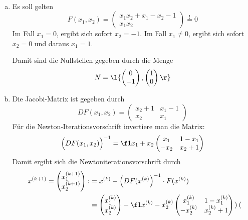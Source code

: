 \documentclass[a4paper]{scrartcl}
\begin{document}
\begin{aufgabe}~

	\begin{enumerate}[a)]
		\item
			Es soll gelten
			\[
				F(x_1,x_2) = \begin{pmatrix}
					x_1x_2 + x_1 - x_2 - 1 \\ x_1x_2
				\end{pmatrix}
				\stackrel != 0
			\]
			Im Fall $x_1 = 0$, ergibt sich sofort $x_2 = -1$.
			Im Fall $x_1 \neq 0$, ergibt sich sofort $x_2 = 0$ und daraus $x_1 = 1$.

			Damit sind die Nullstellen gegeben durch die Menge
			\[
				N = \l\{ \begin{pmatrix}
					0 \\ -1 
				\end{pmatrix}, \begin{pmatrix}
					1 \\ 0
				\end{pmatrix} \r\}
			\]
		\item
			Die Jacobi-Matrix ist gegeben durch
			\[
				DF(x_1,x_2) = \begin{pmatrix}
					x_2 + 1 & x_1 - 1 \\
					x_2 & x_1
				\end{pmatrix}
			\]
			Für die Newton-Iterationsvorschrift invertiere man die Matrix:
			\[
				\Big(DF(x_1,x_2)\Big)^{-1} = \f 1{x_1+x_2} \begin{pmatrix}
					x_1 & 1-x_1 \\
					-x_2 & x_2+1
				\end{pmatrix}
			\]
			Damit ergibt sich die Newtoniterationsvorschrift durch
			\begin{align*}
				x^{(k+1)} = \begin{pmatrix}
					x_1^{(k+1)} \\ x_2^{(k+1)}
				\end{pmatrix} :&= x^{(k)} - \Big(DF(x^{(k)}\Big)^{-1}\cdot F(x^{(k)}) \\ 
				&= \begin{pmatrix}
					x_1^{(k)} \\ x_2^{(k)}
				\end{pmatrix} - \f 1{x^{(k)}-x_2^{(k)}} \begin{pmatrix}
					x_1^{(k)} & 1 - x_1^{(k)} \\
					-x_2^{(k)} & x_2^{(k)} + 1
				\end{pmatrix} \cdot \begin{pmatrix}

\end{pmatrix}
\end{align*}
\end{enumerate}
\end{aufgabe}
\end{document}
